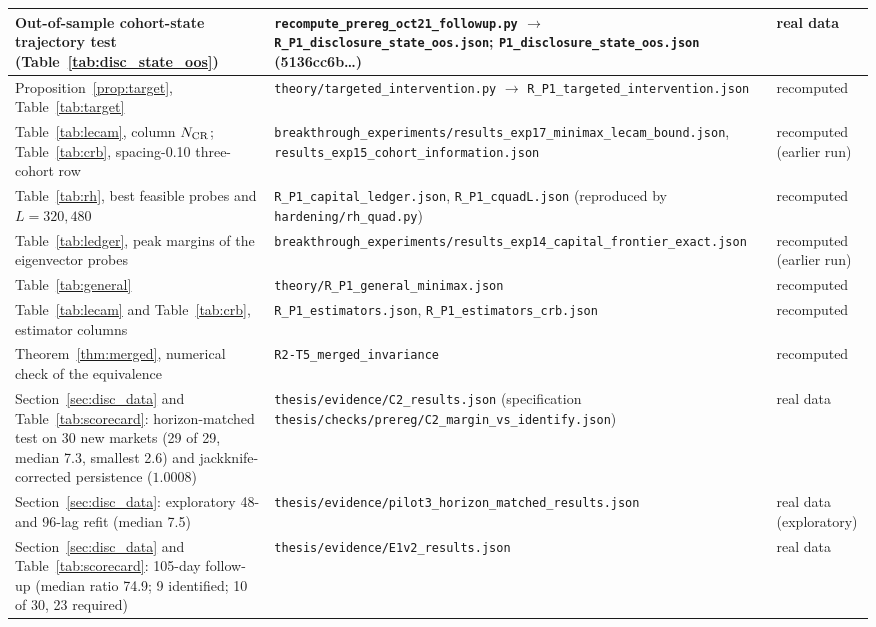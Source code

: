 \documentclass[12pt]{article}
\theoremstyle{definition}
\theoremstyle{remark}
\begin{document}
\begin{longtable}{p{}p{}p{}}
Out-of-sample cohort-state trajectory test (Table~\ref{tab:disc_state_oos}) & \texttt{recompute\_\allowbreak prereg\_\allowbreak oct21\_\allowbreak followup.py} $\to$ \texttt{R\_P1\_\allowbreak disclosure\_\allowbreak state\_\allowbreak oos.json}; \texttt{P1\_\allowbreak disclosure\_\allowbreak state\_\allowbreak oos.json} (5136cc6b\ldots) & real data\\
\bottomrule
Proposition~\ref{prop:target}, Table~\ref{tab:target} & \nolinkurl{theory/targeted_intervention.py} $\to$ \nolinkurl{R_P1_targeted_intervention.json} & recomputed\\
Table~\ref{tab:lecam}, column $N_{\rm CR}$; Table~\ref{tab:crb}, spacing-0.10 three-cohort row & \nolinkurl{breakthrough_experiments/results_exp17_minimax_lecam_bound.json}, \nolinkurl{results_exp15_cohort_information.json} & recomputed (earlier run)\\
Table~\ref{tab:rh}, best feasible probes and $L=320,480$ & \nolinkurl{R_P1_capital_ledger.json}, \nolinkurl{R_P1_cquadL.json} (reproduced by \nolinkurl{hardening/rh_quad.py}) & recomputed\\
Table~\ref{tab:ledger}, peak margins of the eigenvector probes & \nolinkurl{breakthrough_experiments/results_exp14_capital_frontier_exact.json} & recomputed (earlier run)\\
Table~\ref{tab:general} & \nolinkurl{theory/R_P1_general_minimax.json} & recomputed\\
Table~\ref{tab:lecam} and Table~\ref{tab:crb}, estimator columns & \nolinkurl{R_P1_estimators.json}, \nolinkurl{R_P1_estimators_crb.json} & recomputed\\
Theorem~\ref{thm:merged}, numerical check of the equivalence & \nolinkurl{R2-T5_merged_invariance} & recomputed\\
Section~\ref{sec:disc_data} and Table~\ref{tab:scorecard}: horizon-matched test on 30 new markets (29 of 29, median 7.3, smallest 2.6) and jackknife-corrected persistence ($1.0008$) & \nolinkurl{thesis/evidence/C2_results.json} (specification \nolinkurl{thesis/checks/prereg/C2_margin_vs_identify.json}) & real data\\
Section~\ref{sec:disc_data}: exploratory 48- and 96-lag refit (median 7.5) & \nolinkurl{thesis/evidence/pilot3_horizon_matched_results.json} & real data (exploratory)\\
Section~\ref{sec:disc_data} and Table~\ref{tab:scorecard}: 105-day follow-up (median ratio 74.9; 9 identified; 10 of 30, 23 required) & \nolinkurl{thesis/evidence/E1v2_results.json} & real data\\

\end{longtable}
\end{document}
